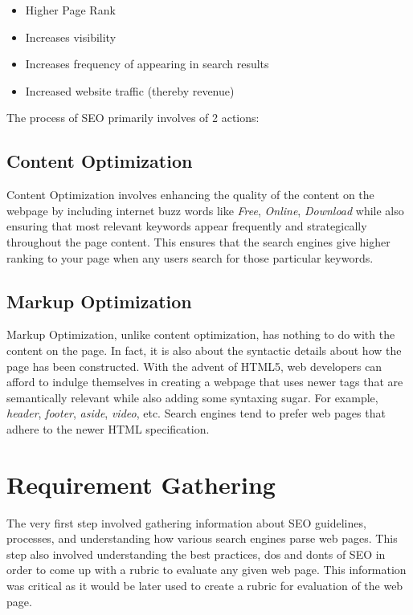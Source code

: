 \documentclass[14pt]{article}
\begin{document}
\begin{itemize}
    \item Higher Page Rank
    \item Increases visibility
    \item Increases frequency of appearing in search results
    \item Increased website traffic (thereby revenue)
\end{itemize}


The process of SEO primarily involves of 2 actions:

\subsection{Content Optimization}
Content Optimization involves enhancing the quality of the content on the webpage by including internet buzz words like \textit{Free}, \textit{Online}, \textit{Download} while also ensuring that most relevant keywords appear frequently and strategically throughout the page content. This ensures that the search engines give higher ranking to your page when any users search for those particular keywords.

\smallskip

\subsection{Markup Optimization}
Markup Optimization, unlike content optimization, has nothing to do with the content on the page. In fact, it is also about the syntactic details about how the page has been constructed. With the advent of HTML5, web developers can afford to indulge themselves in creating a webpage that uses newer tags that are semantically relevant while also adding some syntaxing sugar. For example, \textit{header}, \textit{footer}, \textit{aside}, \textit{video}, etc. Search engines tend to prefer web pages that adhere to the newer HTML specification.
\smallskip


\section{Requirement Gathering}
The very first step involved gathering information about SEO guidelines, processes, and understanding how various search engines parse web pages. This step also involved understanding the best practices, dos and donts of SEO in order to come up with a rubric to evaluate any given web page. This information was critical as it would be later used to create a rubric for evaluation of the web page.
\end{document}

